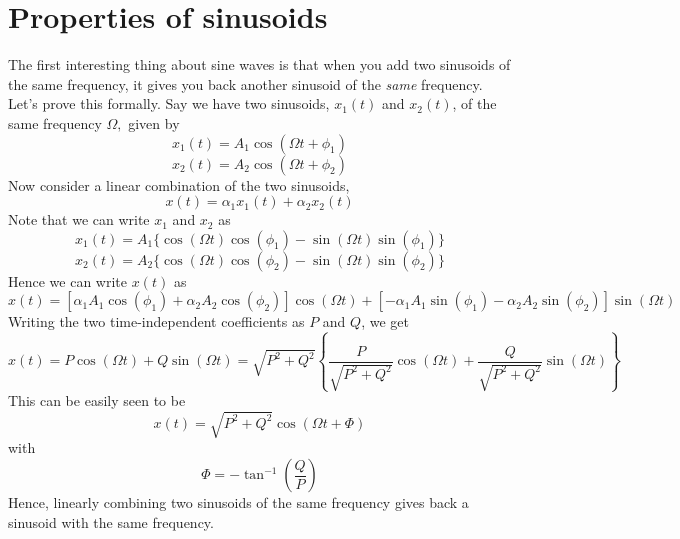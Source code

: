 \section{Properties of sinusoids}
The first interesting thing about sine waves is that when you add two sinusoids
of the same frequency, it gives you back another sinusoid of the \emph{same}
frequency. Let's prove this formally.
Say we have two sinusoids, $x_1 (t)$ and $x_2 (t)$, of the same frequency
$\Omega,$ given by
\begin{equation*}
x_1 (t) = A_1 \cos (\Omega t + \phi_1)
\end{equation*}
\begin{equation*}
x_2 (t) = A_2 \cos (\Omega t + \phi_2)
\end{equation*}
Now consider a linear combination of the two sinusoids,
\begin{equation*}
x (t) = \alpha_1 x_1 (t) + \alpha_2 x_2 (t)
\end{equation*}
Note that we can write $x_1$ and $x_2$ as
\begin{equation*}
x_1 (t) = A_1  \{ \cos (\Omega t) \cos (\phi_1) - \sin (\Omega t) \sin (\phi_1) \}
\end{equation*}
\begin{equation*}
x_2 (t) = A_2  \{ \cos (\Omega t) \cos (\phi_2) - \sin (\Omega t) \sin (\phi_2) \}
\end{equation*}
Hence we can write $x (t)$ as
\begin{equation*}
x (t) = [ \alpha_1 A_1 \cos (\phi_1) + \alpha_2 A_2 \cos (\phi_2) ] \cos
   (\Omega t) + [ - \alpha_1 A_1 \sin (\phi_1) - \alpha_2 A_2 \sin
   (\phi_2) ] \sin (\Omega t)
\end{equation*}
Writing the two time-independent coefficients as $P$ and $Q$, we get
\begin{equation*}
 x (t) = P \cos (\Omega t) + Q \sin (\Omega t) = \sqrt{P^2 + Q^2}  \left\{
   \frac{P}{\sqrt{P^2 + Q^2}} \cos (\Omega t) + \frac{Q}{\sqrt{P^2 + Q^2}}
   \sin (\Omega t) \right\}
\end{equation*}
This can be easily seen to be
\begin{equation*}
 x (t) = \sqrt{P^2 + Q^2} \cos (\Omega t + \Phi)
\end{equation*}
with
\begin{equation*}
\Phi = - \tan^{- 1} \left( \frac{Q}{P} \right)
\end{equation*}
Hence, linearly combining two sinusoids of the same frequency gives back a
sinusoid with the same frequency.\\
